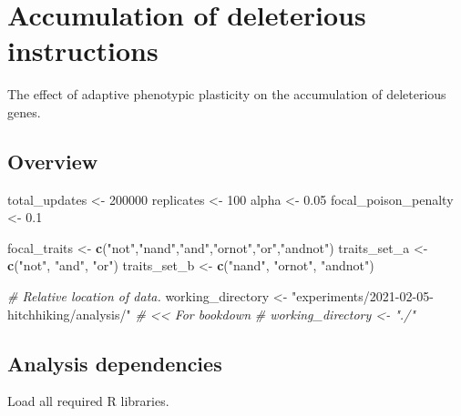 \documentclass[]{book}
\newenvironment{Shaded}{\begin{snugshade}}{\end{snugshade}}
\newcommand{\CommentTok}[1]{\textcolor[rgb]{0.56,0.35,0.01}{\textit{#1}}}
\newcommand{\DecValTok}[1]{\textcolor[rgb]{0.00,0.00,0.81}{#1}}
\newcommand{\FloatTok}[1]{\textcolor[rgb]{0.00,0.00,0.81}{#1}}
\newcommand{\KeywordTok}[1]{\textcolor[rgb]{0.13,0.29,0.53}{\textbf{#1}}}
\newcommand{\NormalTok}[1]{#1}
\newcommand{\StringTok}[1]{\textcolor[rgb]{0.31,0.60,0.02}{#1}}
\begin{document}
\hypertarget{accumulation-of-deleterious-instructions}{%
\chapter{Accumulation of deleterious instructions}\label{accumulation-of-deleterious-instructions}}

The effect of adaptive phenotypic plasticity on the accumulation of deleterious genes.

\hypertarget{overview-3}{%
\section{Overview}\label{overview-3}}

\begin{Shaded}
\begin{Highlighting}[]
\NormalTok{total_updates <-}\StringTok{ }\DecValTok{200000}
\NormalTok{replicates <-}\StringTok{ }\DecValTok{100}
\NormalTok{alpha <-}\StringTok{ }\FloatTok{0.05}
\NormalTok{focal_poison_penalty <-}\StringTok{ }\FloatTok{0.1}

\NormalTok{focal_traits <-}\StringTok{ }\KeywordTok{c}\NormalTok{(}\StringTok{"not"}\NormalTok{,}\StringTok{"nand"}\NormalTok{,}\StringTok{"and"}\NormalTok{,}\StringTok{"ornot"}\NormalTok{,}\StringTok{"or"}\NormalTok{,}\StringTok{"andnot"}\NormalTok{)}
\NormalTok{traits_set_a <-}\StringTok{ }\KeywordTok{c}\NormalTok{(}\StringTok{"not"}\NormalTok{, }\StringTok{"and"}\NormalTok{, }\StringTok{"or"}\NormalTok{)}
\NormalTok{traits_set_b <-}\StringTok{ }\KeywordTok{c}\NormalTok{(}\StringTok{"nand"}\NormalTok{, }\StringTok{"ornot"}\NormalTok{, }\StringTok{"andnot"}\NormalTok{)}

\CommentTok{# Relative location of data.}
\NormalTok{working_directory <-}\StringTok{ "experiments/2021-02-05-hitchhiking/analysis/"} \CommentTok{# << For bookdown}
\CommentTok{# working_directory <- "./"}
\end{Highlighting}
\end{Shaded}

\hypertarget{analysis-dependencies-3}{%
\section{Analysis dependencies}\label{analysis-dependencies-3}}

Load all required R libraries.
\end{document}
